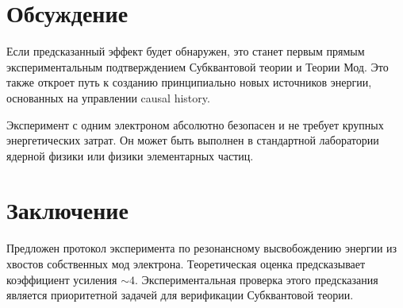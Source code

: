 \documentclass[12pt,a4paper]{article}
\begin{document}
\section{Обсуждение}
Если предсказанный эффект будет обнаружен, это станет первым прямым экспериментальным подтверждением Субквантовой теории и Теории Мод. Это также откроет путь к созданию принципиально новых источников энергии, основанных на управлении causal history.

Эксперимент с одним электроном абсолютно безопасен и не требует крупных энергетических затрат. Он может быть выполнен в стандартной лаборатории ядерной физики или физики элементарных частиц.

\section{Заключение}
Предложен протокол эксперимента по резонансному высвобождению энергии из хвостов собственных мод электрона. Теоретическая оценка предсказывает коэффициент усиления $\sim 4$. Экспериментальная проверка этого предсказания является приоритетной задачей для верификации Субквантовой теории.
\end{document}
